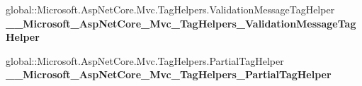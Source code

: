 \begin{DoxyCompactItemize}
\item 
\mbox{\label{class_projeto_e_s_w_1_1_areas_1_1_identity_1_1_pages_1_1_account_1_1_manage_1_1_areas___identityf71e623a7e7907515cd465c2fe005b76_af4d361ca0cfc86d2242f68d5d42c84de}} 
global\+::\+Microsoft.\+Asp\+Net\+Core.\+Mvc.\+Tag\+Helpers.\+Validation\+Message\+Tag\+Helper {\bfseries \+\_\+\+\_\+\+Microsoft\+\_\+\+Asp\+Net\+Core\+\_\+\+Mvc\+\_\+\+Tag\+Helpers\+\_\+\+Validation\+Message\+Tag\+Helper}
\item 
\mbox{\label{class_projeto_e_s_w_1_1_areas_1_1_identity_1_1_pages_1_1_account_1_1_manage_1_1_areas___identityf71e623a7e7907515cd465c2fe005b76_a61ac09c778923b18e1c8f2907563fdf1}} 
global\+::\+Microsoft.\+Asp\+Net\+Core.\+Mvc.\+Tag\+Helpers.\+Partial\+Tag\+Helper {\bfseries \+\_\+\+\_\+\+Microsoft\+\_\+\+Asp\+Net\+Core\+\_\+\+Mvc\+\_\+\+Tag\+Helpers\+\_\+\+Partial\+Tag\+Helper}
\end{DoxyCompactItemize}
